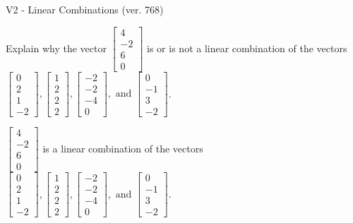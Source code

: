\begin{exercise}
  \begin{exerciseTitle}V2 - Linear Combinations (ver. 768)\end{exerciseTitle}
  \begin{exerciseStatement}
    Explain why the vector \(\left[\begin{array}{c}
4 \\
-2 \\
6 \\
0
\end{array}\right]\)  is or is not a linear 
	combination of the vectors \(\left[\begin{array}{c}
0 \\
2 \\
1 \\
-2
\end{array}\right] , \left[\begin{array}{c}
1 \\
2 \\
2 \\
2
\end{array}\right] , \left[\begin{array}{c}
-2 \\
-2 \\
-4 \\
0
\end{array}\right] , \text{ and } \left[\begin{array}{c}
0 \\
-1 \\
3 \\
-2
\end{array}\right]\).
	


  \end{exerciseStatement}
  \begin{exerciseAnswer}
   \(\left[\begin{array}{c}
4 \\
-2 \\
6 \\
0
\end{array}\right]\) 
  	 is  
	a linear combination of the vectors \(\left[\begin{array}{c}
0 \\
2 \\
1 \\
-2
\end{array}\right] , \left[\begin{array}{c}
1 \\
2 \\
2 \\
2
\end{array}\right] , \left[\begin{array}{c}
-2 \\
-2 \\
-4 \\
0
\end{array}\right] , \text{ and } \left[\begin{array}{c}
0 \\
-1 \\
3 \\
-2
\end{array}\right]\).


\end{exerciseAnswer}
\end{exercise}
